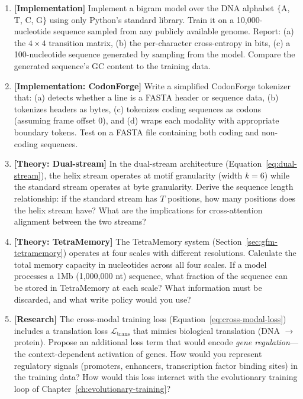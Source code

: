 \begin{enumerate}[label=\textbf{13.\arabic*.}, leftmargin=2.5em]
\item \textbf{[Implementation]} Implement a bigram model over the DNA alphabet $\{$A, T, C, G$\}$ using only Python's standard library. Train it on a 10,000-nucleotide sequence sampled from any publicly available genome. Report: (a) the $4 \times 4$ transition matrix, (b) the per-character cross-entropy in bits, (c) a 100-nucleotide sequence generated by sampling from the model. Compare the generated sequence's GC content to the training data.

\item \textbf{[Implementation: CodonForge]} Write a simplified CodonForge tokenizer that: (a) detects whether a line is a FASTA header or sequence data, (b) tokenizes headers as bytes, (c) tokenizes coding sequences as codons (assuming frame offset 0), and (d) wraps each modality with appropriate boundary tokens. Test on a FASTA file containing both coding and non-coding sequences.

\item \textbf{[Theory: Dual-stream]} In the dual-stream architecture (Equation~\ref{eq:dual-stream}), the helix stream operates at motif granularity (width $k = 6$) while the standard stream operates at byte granularity. Derive the sequence length relationship: if the standard stream has $T$ positions, how many positions does the helix stream have? What are the implications for cross-attention alignment between the two streams?

\item \textbf{[Theory: TetraMemory]} The TetraMemory system (Section~\ref{sec:gfm-tetramemory}) operates at four scales with different resolutions. Calculate the total memory capacity in nucleotides across all four scales. If a model processes a 1Mb (1,000,000 nt) sequence, what fraction of the sequence can be stored in TetraMemory at each scale? What information must be discarded, and what write policy would you use?

\item \textbf{[Research]} The cross-modal training loss (Equation~\ref{eq:cross-modal-loss}) includes a translation loss $\mathcal{L}_{\text{trans}}$ that mimics biological translation (DNA $\to$ protein). Propose an additional loss term that would encode \emph{gene regulation}---the context-dependent activation of genes. How would you represent regulatory signals (promoters, enhancers, transcription factor binding sites) in the training data? How would this loss interact with the evolutionary training loop of Chapter~\ref{ch:evolutionary-training}?


\end{enumerate}
